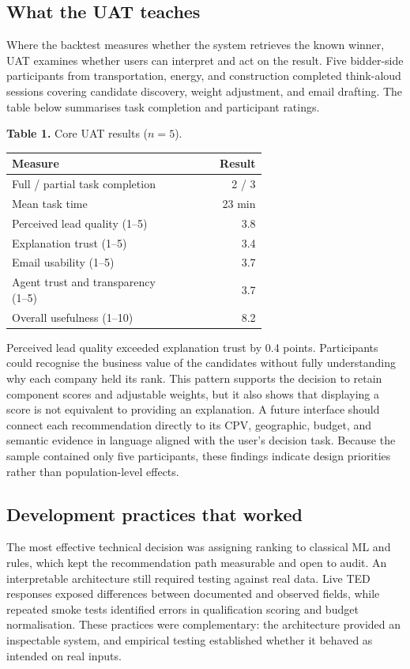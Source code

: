 \documentclass[10pt,a4paper]{article}
\begin{document}
\subsection{What the UAT teaches}
Where the backtest measures whether the system retrieves the known winner, UAT examines whether users can interpret and act on the result. Five bidder-side participants from transportation, energy, and construction completed think-aloud sessions covering candidate discovery, weight adjustment, and email drafting. The table below summarises task completion and participant ratings.

\begin{center}
{\small\textbf{Table 1.} Core UAT results ($n=5$).}\par\vspace{1pt}
\small
\renewcommand{\arraystretch}{0.92}
\begin{tabular}{@{}p{0.64\linewidth}r@{}}
\hline
\textbf{Measure} & \textbf{Result} \\
\hline
Full / partial task completion & 2 / 3 \\
Mean task time & 23 min \\
Perceived lead quality (1--5) & 3.8 \\
Explanation trust (1--5) & 3.4 \\
Email usability (1--5) & 3.7 \\
Agent trust and transparency (1--5) & 3.7 \\
Overall usefulness (1--10) & 8.2 \\
\hline
\end{tabular}
\end{center}

Perceived lead quality exceeded explanation trust by 0.4 points. Participants could recognise the business value of the candidates without fully understanding why each company held its rank. This pattern supports the decision to retain component scores and adjustable weights, but it also shows that displaying a score is not equivalent to providing an explanation. A future interface should connect each recommendation directly to its CPV, geographic, budget, and semantic evidence in language aligned with the user's decision task. Because the sample contained only five participants, these findings indicate design priorities rather than population-level effects.

\subsection{Development practices that worked}
The most effective technical decision was assigning ranking to classical ML and rules, which kept the recommendation path measurable and open to audit. An interpretable architecture still required testing against real data. Live TED responses exposed differences between documented and observed fields, while repeated smoke tests identified errors in qualification scoring and budget normalisation. These practices were complementary: the architecture provided an inspectable system, and empirical testing established whether it behaved as intended on real inputs.
\end{document}
